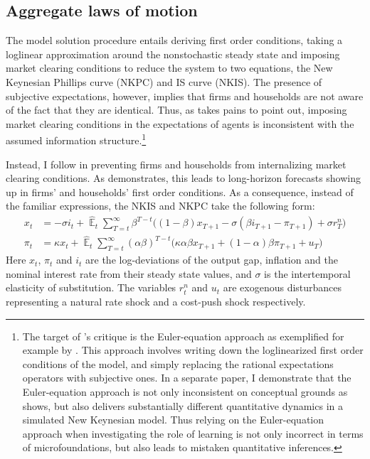 \documentclass[11pt]{article}
\renewcommand{\[}{\begin{equation}}
\renewcommand{\]}{\end{equation}}
\DeclareMathOperator{\E}{\mathbb{E}}
\begin{document}
\subsection{Aggregate laws of motion}\label{FOCs}
The model solution procedure entails deriving first order conditions, taking a loglinear approximation around the nonstochastic steady state and imposing market clearing conditions to reduce the system to two equations, the New Keynesian Phillips curve (NKPC) and IS curve (NKIS). The presence of subjective expectations, however, implies that firms and households are not aware of the fact that they are identical. Thus, as \cite{preston2005} takes pains to point out, imposing market clearing conditions in the expectations of agents is inconsistent with the assumed information structure.\footnote{The target of \cite{preston2005}'s critique is the Euler-equation approach as exemplified for example by \cite{bullard2002learning}. This approach involves writing down the loglinearized first order conditions of the model, and simply replacing the rational expectations operators with subjective ones. In a separate paper, I demonstrate that the Euler-equation approach is not only inconsistent on conceptual grounds as \cite{preston2005} shows, but also delivers substantially different quantitative dynamics in a simulated New Keynesian model. Thus relying on the Euler-equation approach when investigating the role of learning is not only incorrect in terms of microfoundations, but also leads to mistaken quantitative inferences.} 

Instead, I follow \cite{preston2005} in preventing firms and households from internalizing market clearing conditions. As \cite{preston2005} demonstrates, this leads to long-horizon forecasts showing up in firms' and households' first order conditions. As a consequence, instead of the familiar expressions, the NKIS and NKPC take the following form:
 \begin{align}
x_t &=  -\sigma i_t +\hat{\E}_t \sum_{T=t}^{\infty} \beta^{T-t }\big( (1-\beta)x_{T+1} - \sigma(\beta i_{T+1} - \pi_{T+1}) +\sigma r_T^n \big)  \label{NKIS}  \\
\pi_t &= \kappa x_t +\hat{\E}_t \sum_{T=t}^{\infty} (\alpha\beta)^{T-t }\big( \kappa \alpha \beta x_{T+1} + (1-\alpha)\beta \pi_{T+1} + u_T\big) \label{NKPC} 
\end{align}
Here $x_t$, $\pi_t$ and $i_t$ are the log-deviations of the output gap, inflation and the nominal interest rate from their steady state values, and $\sigma$ is the intertemporal elasticity of substitution. The variables $r_t^n$ and $u_t$ are exogenous disturbances representing a natural rate shock and a cost-push shock respectively. 
\end{document}
